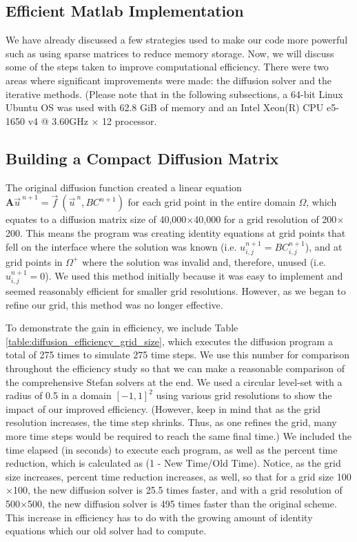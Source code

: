 \documentclass[oneside,12pt,final]{/Applications/TeX/packages/ucthesis-CA2012}
\begin{document}
\begin{mainmatter}
\chapter{Efficient Matlab Implementation}\label{section:gaining_efficiency_0}

We have already discussed a few strategies used to make our code more powerful such as using sparse matrices to reduce memory storage. Now, we will discuss some of the steps taken to improve computational efficiency. There were two areas where significant improvements were made: the diffusion solver and the iterative methods. (Please note that in the following subsections, a 64-bit Linux Ubuntu OS was used with 62.8 GiB of memory and an Intel Xeon(R) CPU e5-1650 v4 @ 3.60GHz $\times$ 12 processor.

\section{Building a Compact Diffusion Matrix}\label{section:gaining_efficiency_1}

The original diffusion function created a linear equation $\boldsymbol{A}\vec{u}^{\>n+1} = \vec{f}\>(\vec{u}^{\>n},BC^{n+1})$ for each grid point in the entire domain $\Omega$, which equates to a diffusion matrix size of 40,000$\times$40,000 for a grid resolution of 200$\times$200. This means the program was creating identity equations at grid points that fell on the interface where the solution was known (i.e. $u^{n+1}_{i,j} = BC^{n+1}_{i,j}$), and at grid points in $\Omega^+$ where the solution was invalid and, therefore, unused (i.e. $u^{n+1}_{i,j} = 0$). We used this method initially because it was easy to implement and seemed reasonably efficient for smaller grid resolutions. However, as we began to refine our grid, this method was no longer effective.

To demonstrate the gain in efficiency, we include Table \ref{table:diffusion_efficiency_grid_size}, which executes the diffusion program a total of 275 times to simulate 275 time steps. We use this number for comparison throughout the efficiency study so that we can make a reasonable comparison of the comprehensive Stefan solvers at the end. We used a circular level-set with a radius of 0.5 in a domain $[-1,1]^2$ using various grid resolutions to show the impact of our improved efficiency. (However, keep in mind that as the grid resolution increases, the time step shrinks. Thus, as one refines the grid, many more time steps would be required to reach the same final time.) We included the time elapsed (in seconds) to execute each program, as well as the percent time reduction, which is calculated as (1 - New Time/Old Time). Notice, as the grid size increases, percent time reduction increases, as well, so that for a grid size 100$\times$100, the new diffusion solver is 25.5 times faster, and with a grid resolution of 500$\times$500, the new diffusion solver is 495 times faster than the original scheme. This increase in efficiency has to do with the growing amount of identity equations which our old solver had to compute. 


\end{mainmatter}
\end{document}
